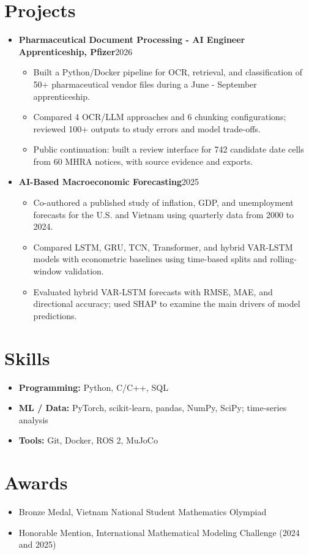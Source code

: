 \documentclass[letterpaper,10pt]{article}
\newcommand{\resumeItem}[1]{\item {#1}}
\newcommand{\resumeProjectHeading}[2]{
  \item {#1\hfill #2\par}\vspace{-3pt}
}
\newcommand{\resumeSubHeadingListStart}{\begin{itemize}[leftmargin=0.15in,label={},itemsep=7pt,topsep=4pt,parsep=0pt]}
\newcommand{\resumeSubHeadingListEnd}{\end{itemize}}
\newcommand{\resumeItemListStart}{\begin{itemize}[leftmargin=0.20in,itemsep=3pt,topsep=4pt,parsep=0pt]}
\newcommand{\resumeItemListEnd}{\end{itemize}\vspace{-4pt}}
\begin{document}
\section{Projects}
\resumeSubHeadingListStart
\resumeProjectHeading{\textbf{Pharmaceutical Document Processing - AI Engineer Apprenticeship, Pfizer}}{2026}
\resumeItemListStart
\resumeItem{Built a Python/Docker pipeline for OCR, retrieval, and classification of 50+ pharmaceutical vendor files during a June - September apprenticeship.}
\resumeItem{Compared 4 OCR/LLM approaches and 6 chunking configurations; reviewed 100+ outputs to study errors and model trade-offs.}
\resumeItem{Public continuation: built a review interface for 742 candidate date cells from 60 MHRA notices, with source evidence and exports.}
\resumeItemListEnd
\resumeProjectHeading{\textbf{AI-Based Macroeconomic Forecasting}}{2025}
\resumeItemListStart
\resumeItem{Co-authored a published study of inflation, GDP, and unemployment forecasts for the U.S. and Vietnam using quarterly data from 2000 to 2024.}
\resumeItem{Compared LSTM, GRU, TCN, Transformer, and hybrid VAR-LSTM models with econometric baselines using time-based splits and rolling-window validation.}
\resumeItem{Evaluated hybrid VAR-LSTM forecasts with RMSE, MAE, and directional accuracy; used SHAP to examine the main drivers of model predictions.}
\resumeItemListEnd
\resumeSubHeadingListEnd
\section{Skills}
\begin{itemize}[leftmargin=0.15in,label={},itemsep=3pt,topsep=3pt,parsep=0pt]
\item \textbf{Programming:} Python, C/C++, SQL
\item \textbf{ML / Data:} PyTorch, scikit-learn, pandas, NumPy, SciPy; time-series analysis
\item \textbf{Tools:} Git, Docker, ROS 2, MuJoCo
\end{itemize}
\section{Awards}
\begin{itemize}[leftmargin=0.15in,label={},itemsep=3pt,topsep=3pt,parsep=0pt]
\item Bronze Medal, Vietnam National Student Mathematics Olympiad
\item Honorable Mention, International Mathematical Modeling Challenge (2024 and 2025)
\end{itemize}
\end{document}
